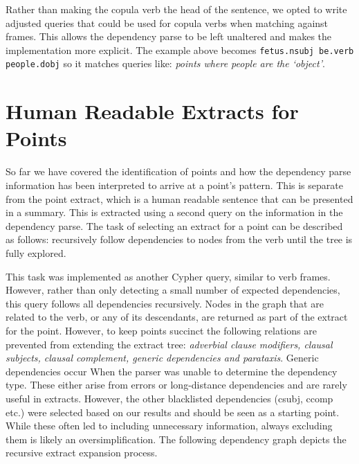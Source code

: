       Rather than making the copula verb the head of the sentence, we opted to write adjusted queries that could be used for copula verbs when matching against frames. This allows the dependency parse to be left unaltered and makes the implementation more explicit. The example above becomes \texttt{fetus.nsubj be.verb people.dobj} so it matches queries like: \textit{points where people are the `object'}.

  \section{Human Readable Extracts for Points}
    So far we have covered the identification of points and how the dependency parse information has been interpreted to arrive at a point's pattern. This is separate from the point extract, which is a human readable sentence that can be presented in a summary. This is extracted using a second query on the information in the dependency parse. The task of selecting an extract for a point can be described as follows: recursively follow dependencies to nodes from the verb until the tree is fully explored.

    This task was implemented as another Cypher query, similar to verb frames. However, rather than only detecting a small number of expected dependencies, this query follows all dependencies recursively. Nodes in the graph that are related to the verb, or any of its descendants, are returned as part of the extract for the point. However, to keep points succinct the following relations are prevented from extending the extract tree: \textit{adverbial clause modifiers, clausal subjects, clausal complement, generic dependencies and parataxis}. Generic dependencies occur When the parser was unable to determine the dependency type. These either arise from errors or long-distance dependencies and are rarely useful in extracts. However, the other blacklisted dependencies (csubj, ccomp etc.) were selected based on our results and should be seen as a starting point. While these often led to including unnecessary information, always excluding them is likely an oversimplification. The following dependency graph depicts the recursive extract expansion process.

